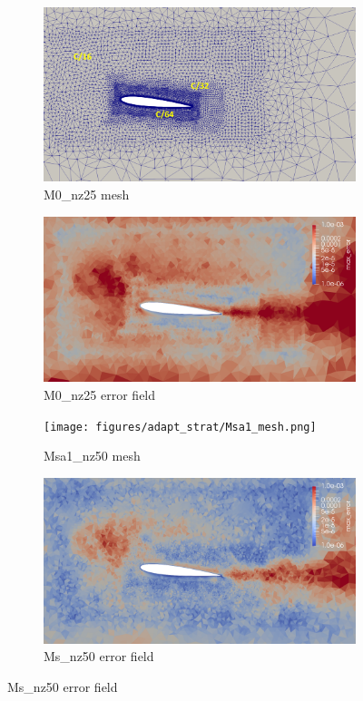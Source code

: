 \begin{figure}[H]
\centering
\begin{subfigure}[b]{0.475\textwidth}
\centering
\includegraphics[width=1\textwidth]{figures/adapt_strat/M0_mesh.png}
\caption{M0\_nz25 mesh}
\label{fig:M0_mesh_sa}
\end{subfigure}
\begin{subfigure}[b]{0.475\textwidth}
\centering
\includegraphics[width=1\textwidth]{figures/adapt_strat/M0_error.png}
\caption{M0\_nz25 error field}
\label{fig:M0_err_plot_sa}
\end{subfigure}
\begin{subfigure}[b]{0.475\textwidth}
\centering
\texttt{[image: figures/adapt\_strat/Msa1\_mesh.png]}
\caption{Msa1\_nz50 mesh}
\label{fig:h_adapt1_mesh}
\end{subfigure}
\begin{subfigure}[b]{0.475\textwidth}
\centering
\includegraphics[width=1\textwidth]{figures/adapt_strat/Msa1_error.png}
\caption{Ms\_nz50 error field}
\label{fig:h_adapt1_error_plot}
\end{subfigure}


\end{figure}
